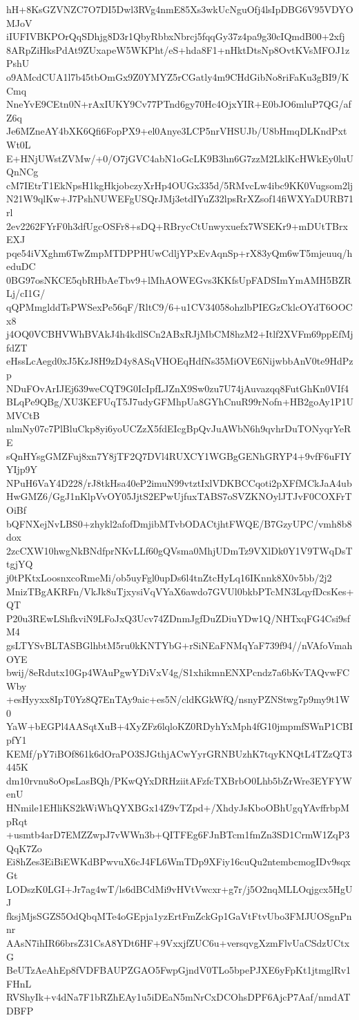 hH+8KsGZVNZC7O7DI5Dwl3RVg4nmE85Xs3wkUcNguOfj4lsIpDBG6V95VDYOMJoV
iIUFIVBKPOrQqSDhjg8D3r1QbyRbbxNbrcj5fqqGy37z4pa9g30cIQmdB00+2xfj
8ARpZiHksPdAt9ZUxapeW5WKPht/eS+hda8F1+nHktDtsNp8OvtKVsMFOJ1zPshU
o9AMcdCUA1l7b45tbOmGx9Z0YMYZ5rCGatly4m9CHdGibNo8riFaKu3gBI9/KCmq
NneYvE9CEtn0N+rAxIUKY9Cv77PTnd6gy70Hc4OjxYIR+E0bJO6mluP7QG/afZ6q
Je6MZneAY4bXK6Qfi6FopPX9+el0Anye3LCP5nrVHSUJb/U8bHmqDLKndPxtWt0L
E+HNjUWstZVMw/+0/O7jGVC4abN1oGcLK9B3hn6G7zzM2LklKcHWkEy0luUQnNCg
cM7IEtrT1EkNpsH1kgHkjobczyXrHp4OUGx335d/5RMvcLw4ibc9KK0Vugsom2lj
N21W9qlKw+J7PshNUWEFgUSQrJMj3etdIYuZ32lpsRrXZsof14fiWXYaDURB71rl
2ev2262FYrF0h3dfUgcOSFr8+sDQ+RBrycCtUnwyxuefx7WSEKr9+mDUtTBrxEXJ
pqe54iVXghm6TwZmpMTDPPHUwCdljYPxEvAqnSp+rX83yQm6wT5mjeuuq/heduDC
0BG97osNKCE5qbRHbAeTbv9+lMhAOWEGvs3KKfsUpFADSImYmAMH5BZRLj/cI1G/
qQPMmglddTsPWSexPe56qF/RltC9/6+u1CV34058ohzlbPIEGzCklcOYdT6OOCx8
j4OQ0VCBHVWhBVAkJ4h4kdlSCn2ABxRJjMbCM8hzM2+Itlf2XVFm69ppEfMjfdZT
eHssLcAegd0xJ5KzJ8H9zD4y8ASqVHOEqHdfNs35MiOVE6NijwbbAnV0te9HdPzp
NDuFOvArIJEj639weCQT9G0IcIpfLJZnX9Sw0zu7U74jAuvazqq8FutGhKn0VIf4
BLqPe9QBg/XU3KEFUqT5J7udyGFMhpUa8GYhCnuR99rNofn+HB2goAy1P1UMVCtB
nlmNy07c7PlBluCkp8yi6yoUCZzX5fdEIcgBpQvJuAWbN6h9qvhrDuTONyqrYeRE
sQnHYsgGMZFuj8xn7Y8jTF2Q7DVl4RUXCY1WGBgGENhGRYP4+9vfF6uFIYYIjp9Y
NPuH6VaY4D228/rJ8tkHsa40eP2imuN99vtztIxlVDKBCCqoti2pXFfMCkJaA4ub
HwGMZ6/GgJ1nKlpVvOY05JjtS2EPwUjfuxTABS7oSVZKNOylJTJvF0COXFrTOiBf
bQFNXejNvLBS0+zhykl2afofDmjibMTvbODACtjhtFWQE/B7GzyUPC/vmh8b8dox
2zcCXW10hwgNkBNdfprNKvLLf60gQVsma0MhjUDmTz9VXlDk0Y1V9TWqDsTtgjYQ
j0tPKtxLoosnxcoRmeMi/ob5uyFgl0upDs6l4tnZtcHyLq16IKnnk8X0v5bb/2j2
MnizTBgAKRFn/VkJk8uTjxysiVqVYaX6awdo7GVUl0bkbPTcMN3LqyfDcsKes+QT
P20u3REwLShfkviN9LFoJxQ3Ucv74ZDnmJgfDuZDiuYDw1Q/NHTxqFG4Csi9sfM4
gsLTYSvBLTASBGlhbtM5ru0kKNTYbG+rSiNEaFNMqYaF739f94//nVAfoVmahOYE
bwij/8eRdutx10Gp4WAuPgwYDiVxV4g/S1xhikmnENXPcndz7a6bKvTAQvwFCWby
+esHyyxx8IpT0Yz8Q7EnTAy9aic+es5N/cldKGkWfQ/nsnyPZNStwg7p9my9t1W0
YaW+bEGPl4AASqtXuB+4XyZFz6lqloKZ0RDyhYxMph4fG10jmpmfSWnP1CBIpfY1
KEMf/pY7iBOf861k6dOraPO3SJGthjACwYyrGRNBUzhK7tqyKNQtL4TZzQT3445K
dm10rvnu8oOpsLasBQh/PKwQYxDRHziitAFzfcTXBrbO0Lhb5bZrWre3EYFYWenU
HNmile1EHliKS2kWiWhQYXBGx14Z9vTZpd+/XhdyJsKboOBhUgqYAvffrbpMpRqt
+usmtb4arD7EMZZwpJ7vWWn3b+QITFEg6FJnBTcm1fmZn3SD1CrmW1ZqP3QqK7Zo
Ei8hZes3EiBiEWKdBPwvuX6cJ4FL6WmTDp9XFiy16cuQu2ntembcmogIDv9sqxGt
LODszK0LGI+Jr7ag4wT/ls6dBCdMi9vHVtVwcxr+g7r/j5O2nqMLLOqjgcx5HgUJ
fksjMjsSGZS5OdQbqMTe4oGEpja1yzErtFmZckGp1GaVtFtvUbo3FMJUOSgnPnnr
AAsN7ihIR66brsZ31CsA8YDt6HF+9VxxjfZUC6u+versqvgXzmFlvUaCSdzUCtxG
BeUTzAeAhEp8fVDFBAUPZGAO5FwpGjndV0TLo5bpePJXE6yFpKt1jtmglRv1FHnL
RVShyIk+v4dNa7F1bRZhEAy1u5iDEaN5mNrCxDCOhsDPF6AjcP7Aaf/nmdATDBFP
